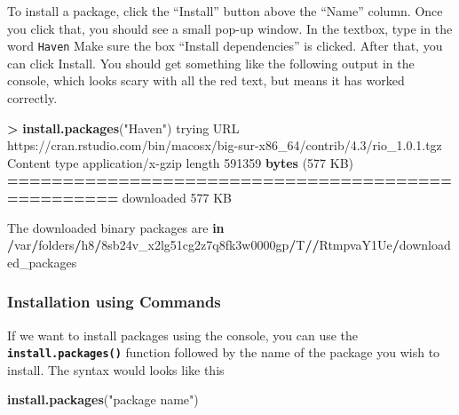 \documentclass[
]{book}
\newenvironment{Shaded}{\begin{snugshade}}{\end{snugshade}}
\newcommand{\ControlFlowTok}[1]{\textcolor[rgb]{0.13,0.29,0.53}{\textbf{#1}}}
\newcommand{\DecValTok}[1]{\textcolor[rgb]{0.00,0.00,0.81}{#1}}
\newcommand{\ErrorTok}[1]{\textcolor[rgb]{0.64,0.00,0.00}{\textbf{#1}}}
\newcommand{\FunctionTok}[1]{\textcolor[rgb]{0.13,0.29,0.53}{\textbf{#1}}}
\newcommand{\NormalTok}[1]{#1}
\newcommand{\SpecialCharTok}[1]{\textcolor[rgb]{0.81,0.36,0.00}{\textbf{#1}}}
\newcommand{\StringTok}[1]{\textcolor[rgb]{0.31,0.60,0.02}{#1}}
\begin{document}
To install a package, click the ``Install'' button above the ``Name'' column. Once you click that, you should see a small pop-up window. In the textbox, type in the word \texttt{Haven} Make sure the box ``Install dependencies'' is clicked. After that, you can click Install. You should get something like the following output in the console, which looks scary with all the red text, but means it has worked correctly.

\begin{Shaded}
\begin{Highlighting}[]
\SpecialCharTok{\textgreater{}} \FunctionTok{install.packages}\NormalTok{(}\StringTok{"Haven"}\NormalTok{)}
\NormalTok{trying URL }\StringTok{\textquotesingle{}https://cran.rstudio.com/bin/macosx/big{-}sur{-}x86\_64/contrib/4.3/rio\_1.0.1.tgz\textquotesingle{}}
\NormalTok{Content type }\StringTok{\textquotesingle{}application/x{-}gzip\textquotesingle{}}\NormalTok{ length }\DecValTok{591359} \FunctionTok{bytes}\NormalTok{ (}\DecValTok{577}\NormalTok{ KB)}
\SpecialCharTok{==}\ErrorTok{================================================}
\NormalTok{downloaded }\DecValTok{577}\NormalTok{ KB}


\NormalTok{The downloaded binary packages are }\ControlFlowTok{in}
    \SpecialCharTok{/}\NormalTok{var}\SpecialCharTok{/}\NormalTok{folders}\SpecialCharTok{/}\NormalTok{h8}\SpecialCharTok{/}\NormalTok{8sb24v\_x2lg51cg2z7q8fk3w0000gp}\SpecialCharTok{/}\NormalTok{T}\SpecialCharTok{/}\ErrorTok{/}\NormalTok{RtmpvaY1Ue}\SpecialCharTok{/}\NormalTok{downloaded\_packages}
\end{Highlighting}
\end{Shaded}

\hypertarget{installation-using-commands}{%
\subsubsection{Installation using Commands}\label{installation-using-commands}}

If we want to install packages using the console, you can use the \textbf{\texttt{install.packages()}} function followed by the name of the package you wish to install. The syntax would looks like this

\begin{Shaded}
\begin{Highlighting}[]
\FunctionTok{install.packages}\NormalTok{(}\StringTok{"package name"}\NormalTok{)}
\end{Highlighting}
\end{Shaded}
\end{document}
